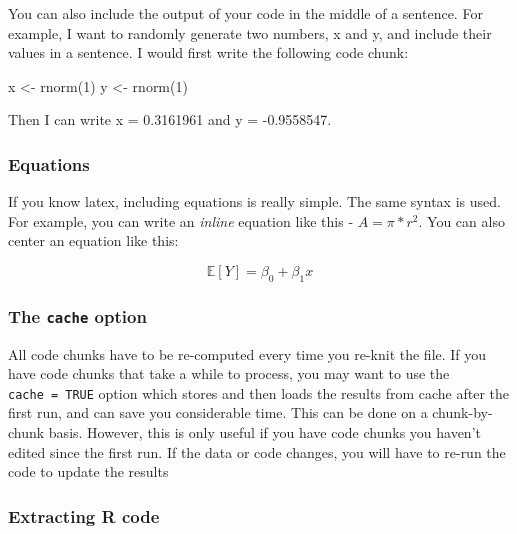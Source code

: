\documentclass[
]{article}
\newenvironment{Shaded}{\begin{snugshade}}{\end{snugshade}}
\newcommand{\DecValTok}[1]{\textcolor[rgb]{0.00,0.00,0.81}{#1}}
\newcommand{\FunctionTok}[1]{\textcolor[rgb]{0.00,0.00,0.00}{#1}}
\newcommand{\NormalTok}[1]{#1}
\newcommand{\OtherTok}[1]{\textcolor[rgb]{0.56,0.35,0.01}{#1}}
\begin{document}
You can also include the output of your code in the middle of a
sentence. For example, I want to randomly generate two numbers, x and y,
and include their values in a sentence. I would first write the
following code chunk:

\begin{Shaded}
\begin{Highlighting}[]
\NormalTok{x }\OtherTok{\textless{}{-}} \FunctionTok{rnorm}\NormalTok{(}\DecValTok{1}\NormalTok{)}
\NormalTok{y }\OtherTok{\textless{}{-}} \FunctionTok{rnorm}\NormalTok{(}\DecValTok{1}\NormalTok{)}
\end{Highlighting}
\end{Shaded}

Then I can write x = 0.3161961 and y = -0.9558547.

\hypertarget{equations}{%
\subsubsection{Equations}\label{equations}}

If you know latex, including equations is really simple. The same syntax
is used. For example, you can write an \emph{inline} equation like this
- \(A = \pi*r^{2}\). You can also center an equation like this:

\begin{equation}
\mathbb{E}[Y] = \beta_0 + \beta_1x
\end{equation}

\hypertarget{the-cache-option}{%
\subsubsection{\texorpdfstring{The \texttt{cache}
option}{The cache option}}\label{the-cache-option}}

All code chunks have to be re-computed every time you re-knit the file.
If you have code chunks that take a while to process, you may want to
use the \texttt{cache\ =\ TRUE} option which stores and then loads the
results from cache after the first run, and can save you considerable
time. This can be done on a chunk-by-chunk basis. However, this is only
useful if you have code chunks you haven't edited since the first run.
If the data or code changes, you will have to re-run the code to update
the results

\hypertarget{extracting-r-code}{%
\subsubsection{Extracting R code}\label{extracting-r-code}}
\end{document}
